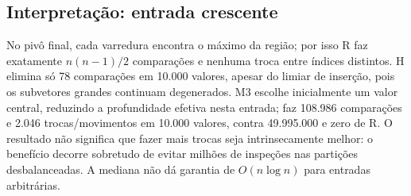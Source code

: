 \subsection*{Interpretação: entrada crescente}
No pivô final, cada varredura encontra o máximo da região; por isso R faz exatamente $n(n-1)/2$ comparações e nenhuma troca entre índices distintos. H elimina só 78 comparações em 10.000 valores, apesar do limiar de inserção, pois os subvetores grandes continuam degenerados. M3 escolhe inicialmente um valor central, reduzindo a profundidade efetiva nesta entrada; faz 108.986 comparações e 2.046 trocas/movimentos em 10.000 valores, contra 49.995.000 e zero de R. O resultado não significa que fazer mais trocas seja intrinsecamente melhor: o benefício decorre sobretudo de evitar milhões de inspeções nas partições desbalanceadas. A mediana não dá garantia de $O(n\log n)$ para entradas arbitrárias.
